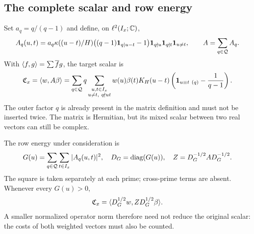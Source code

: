 \subsection{The complete scalar and row energy}
Set $a_q=q/(q-1)$ and define, on $\ell^2(I_x;\mathbb C)$,
\[
A_q(u,t)=a_q\kappa((u-t)/H)
\big((q-1)\mathbf 1_{q\mid u-t}-1\big)\mathbf 1_{q\nmid u}\mathbf 1_{q\nmid t}\mathbf 1_{u\ne t},
\qquad A=\sum_{q\in\mathcal Q}A_q.
\]
With $\langle f,g\rangle=\sum\overline f g$, the target scalar is
\begin{equation}
\mathfrak C_x=\langle w,A\beta\rangle
=\sum_{q\in\mathcal Q}q\sum_{\substack{u,t\in I_x\\u\ne t,\ q\nmid ut}}
w(u)\beta(t)K_H(u-t)\left(\mathbf 1_{u\equiv t\ (q)}-\frac1{q-1}\right).
\label{eq:scalar}
\end{equation}
The outer factor $q$ is already present in the matrix definition and must not be inserted twice. The matrix is Hermitian, but its mixed scalar between two real vectors can still be complex.

The row energy under consideration is
\[
G(u)=\sum_{q\in\mathcal Q}\sum_{t\in I_x}|A_q(u,t)|^2,\quad
D_G=\operatorname{diag}(G(u)),\quad Z=D_G^{-1/2}AD_G^{-1/2}.
\]
The square is taken separately at each prime; cross-prime terms are absent. Whenever every $G(u)>0$,
\begin{equation}
\mathfrak C_x=\langle D_G^{1/2}w,Z D_G^{1/2}\beta\rangle.\label{eq:readout}
\end{equation}
A smaller normalized operator norm therefore need not reduce the original scalar: the costs of both weighted vectors must also be counted.

